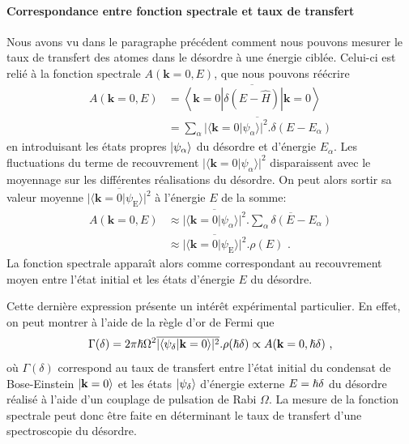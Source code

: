 \paragraph*{Correspondance entre fonction spectrale et taux de transfert}
Nous avons vu dans le paragraphe précédent comment nous pouvons mesurer le taux de transfert des atomes dans le désordre à une énergie ciblée. Celui-ci est relié à la fonction spectrale $A(\mathbf{k}=0,E)$, que nous pouvons réécrire
\begin{align}
A(\mathbf{k}=0,E)&=\overline{\left\langle \mathbf{k}=0 \left| \delta(E-\hat{H}) \right| \mathbf{k}=0 \right\rangle} \\
&= \overline{\sum_{\alpha}{|\langle\mathbf{k}=0 | \psi_{\alpha}\rangle|^2.\delta(E-E_{\alpha})}}
\end{align}
en introduisant les états propres $\left| \psi_{\alpha} \right\rangle$ du désordre et d'énergie $E_{\alpha}$. Les fluctuations du terme de recouvrement $|\langle \mathbf{k}=0 | \psi_{\alpha} \rangle|^2$ disparaissent avec le moyennage sur les différentes réalisations du désordre. On peut alors sortir sa valeur moyenne $\overline{|\langle \mathbf{k}=0 | \psi_{\mathrm{E}} \rangle|^2}$ à l'énergie $E$ de la somme:
\begin{align}
A(\mathbf{k}=0,E)&\approx \overline{|\langle \mathbf{k}=0 | \psi_{\alpha} \rangle|^2}. \overline{\sum_{\alpha}{\delta(E-E_{\alpha})}} \\
&\approx \overline{|\langle \mathbf{k}=0 | \psi_{\mathrm{E}} \rangle|^2} . \rho(E) \text{ .}
\end{align}
La fonction spectrale apparaît alors comme correspondant au recouvrement moyen entre l'état initial et les états d'énergie $E$ du désordre.

Cette dernière expression présente un intérêt expérimental particulier. En effet, on peut montrer à l'aide de la règle d'or de Fermi que
\begin{equation}
\Gamma(\delta)=2 \pi \hslash \Omega^2 \overline{|\langle \psi_{\delta} | \mathbf{k}=0 \rangle|^2} . \rho(\hslash\delta) \propto A(\mathbf{k}=0 ,\hslash \delta) \text{ ,}
\end{equation}
où $\Gamma(\delta)$ correspond au taux de transfert entre l'état initial du condensat de Bose-Einstein $\left| \mathbf{k}=0 \right\rangle$ et les états $\left| \psi_{\delta} \right\rangle$ d'énergie externe $E=\hslash\delta$ du désordre réalisé à l'aide d'un couplage de pulsation de Rabi $\Omega$. La mesure de la fonction spectrale peut donc être faite en déterminant le taux de transfert d'une spectroscopie du désordre.

